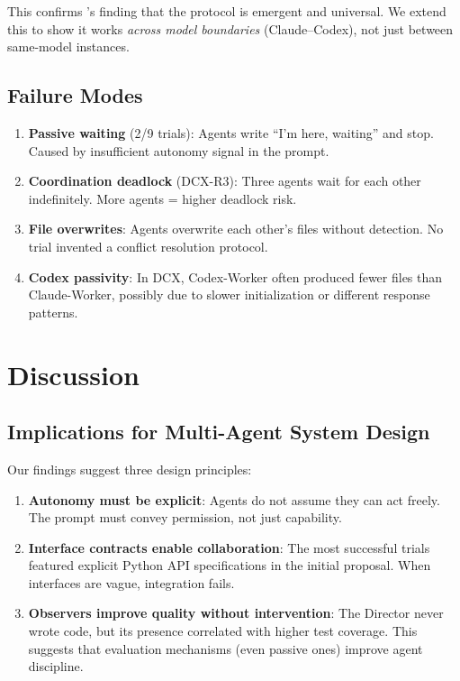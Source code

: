 \documentclass[11pt,a4paper]{article}
\begin{document}
This confirms \citet{papailiopoulos2026}'s finding that the protocol is emergent and
universal. We extend this to show it works \emph{across model boundaries} (Claude--Codex),
not just between same-model instances.

\subsection{Failure Modes}

\begin{enumerate}
  \item \textbf{Passive waiting} (2/9 trials): Agents write ``I'm here, waiting'' and
    stop. Caused by insufficient autonomy signal in the prompt.
  \item \textbf{Coordination deadlock} (DCX-R3): Three agents wait for each other
    indefinitely. More agents = higher deadlock risk.
  \item \textbf{File overwrites}: Agents overwrite each other's files without detection.
    No trial invented a conflict resolution protocol.
  \item \textbf{Codex passivity}: In DCX, Codex-Worker often produced fewer files than
    Claude-Worker, possibly due to slower initialization or different response patterns.
\end{enumerate}

\section{Discussion}

\subsection{Implications for Multi-Agent System Design}

Our findings suggest three design principles:

\begin{enumerate}
  \item \textbf{Autonomy must be explicit}: Agents do not assume they can act freely.
    The prompt must convey permission, not just capability.
  \item \textbf{Interface contracts enable collaboration}: The most successful trials
    featured explicit Python API specifications in the initial proposal. When interfaces
    are vague, integration fails.
  \item \textbf{Observers improve quality without intervention}: The Director never wrote
    code, but its presence correlated with higher test coverage. This suggests that
    evaluation mechanisms (even passive ones) improve agent discipline.
\end{enumerate}
\end{document}
